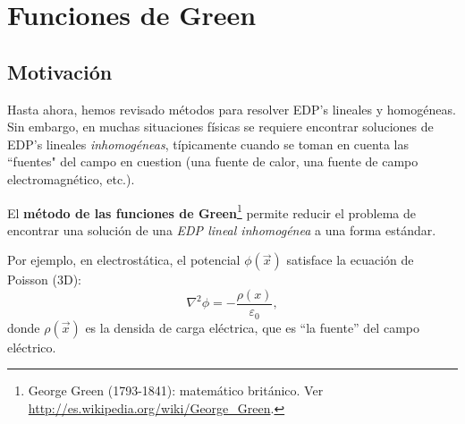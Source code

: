 \chapter{Funciones de Green}

\section{Motivación}

Hasta ahora, hemos revisado métodos para resolver EDP's lineales y homogéneas. Sin embargo, en muchas situaciones físicas se requiere encontrar soluciones de EDP's lineales \textit{inhomogéneas}, típicamente cuando se toman en cuenta las ``fuentes" del campo en cuestion (una fuente de calor, una fuente de campo electromagnético, etc.).

El \textbf{método de las funciones de Green}\footnote{George Green (1793-1841): matemático británico. Ver \url{http://es.wikipedia.org/wiki/George_Green}.} permite reducir el problema de encontrar una solución de una \textit{EDP lineal inhomogénea} a una forma estándar.

Por ejemplo, en electrostática, el potencial $\phi(\vec{x})$ satisface la ecuación de Poisson (3D):
\begin{equation}\label{Poisson}
\nabla^2\phi=-\frac{\rho(x)}{\varepsilon_0},
\end{equation}
donde $\rho(\vec{x})$ es la densida de carga eléctrica, que es ``la fuente'' del campo eléctrico.

